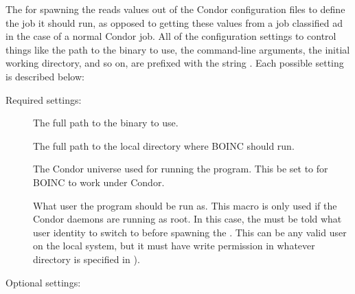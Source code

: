 The  for spawning the  reads
values out of the Condor configuration files to define the job it
should run, as opposed to getting these values from a job classified
ad in the case of a normal Condor job.
All of the configuration settings to control things like the path to
the  binary to use, the command-line arguments,
the initial working directory, and so on, are prefixed with the string
.
Each possible setting is described below: 

Required settings:

\begin{description}

\item[] \label{param:BoincExecutable} The
  full path to the  binary to use.

\item[] \label{param:BoincInitialDir} The
  full path to the local directory where BOINC should run.

\item[] \label{param:BoincUniverse} The Condor
  universe used for running the  program.
  This  be set to  for BOINC to work under
  Condor.

\item[] \label{param:BoincOwner} What user the
   program should be run as.
  This macro is only used if the Condor daemons are running as root.
  In this case, the  must be told what user identity
  to switch to before spawning the .
  This can be any valid user on the local system, but it must have
  write permission in whatever directory is specified in
  ).

\end{description}

Optional settings:

